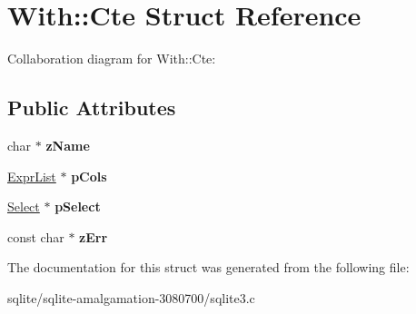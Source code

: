 \hypertarget{struct_with_1_1_cte}{\section{With\+:\+:Cte Struct Reference}
\label{struct_with_1_1_cte}
}


Collaboration diagram for With\+:\+:Cte\+:
\subsection*{Public Attributes}
\begin{DoxyCompactItemize}
\item 
\hypertarget{struct_with_1_1_cte_a3ce66361944f92f0d3fc354025320dd6}{char $\ast$ {\bfseries z\+Name}}\label{struct_with_1_1_cte_a3ce66361944f92f0d3fc354025320dd6}

\item 
\hypertarget{struct_with_1_1_cte_a9e43b7bf43ff5878c465f683fc464456}{\hyperlink{struct_expr_list}{Expr\+List} $\ast$ {\bfseries p\+Cols}}\label{struct_with_1_1_cte_a9e43b7bf43ff5878c465f683fc464456}

\item 
\hypertarget{struct_with_1_1_cte_a90fd9f2a4529a6fd1e75cabeccec16cd}{\hyperlink{struct_select}{Select} $\ast$ {\bfseries p\+Select}}\label{struct_with_1_1_cte_a90fd9f2a4529a6fd1e75cabeccec16cd}

\item 
\hypertarget{struct_with_1_1_cte_a33b21c782d44d19d8944eb944c23b6ef}{const char $\ast$ {\bfseries z\+Err}}\label{struct_with_1_1_cte_a33b21c782d44d19d8944eb944c23b6ef}

\end{DoxyCompactItemize}


The documentation for this struct was generated from the following file\+:\begin{DoxyCompactItemize}
\item 
sqlite/sqlite-\/amalgamation-\/3080700/sqlite3.\+c\end{DoxyCompactItemize}
